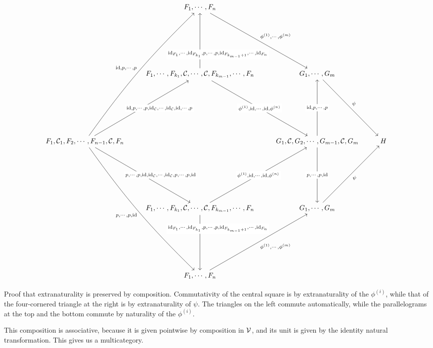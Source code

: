 \begin{SidewaysFigure}
  \[
    \begin{tikzcd}[ampersand replacement=\&, row sep=80pt, column sep=23pt]
        \& F_1,\cdots,F_n \arrow[dr, "{\phi^{(1)},\cdots,\phi^{(m)}}"]
          \&
            \& \\
        \& F_1,\cdots,F_{k_1},\C,\cdots,\C,F_{k_{m-1}},\cdots,F_n \arrow[u, "{\id_{F_1},\cdots,\id_{F_{k_1}},p,\cdots,p,\id_{F_{k_{m-1}+1}},\cdots,\id_{F_n}}"' {description, near start, xshift=6ex}] \arrow[dr, "{\phi^{(1)},\id,\cdots,\id,\phi^{(n)}}" description]
          \& G_1,\cdots,G_m \arrow[dr, "\psi"]
            \& \\
      F_1,\C_1,F_2,\cdots,F_{n-1},\C,F_n \arrow[uur, "{\id,p,\cdots,p}", bend left=5] \arrow[ddr, "{p,\cdots,p,\id}"', bend right=5] \arrow[ur, "{\id,p,\cdots,p,\id_{\C},\cdots,\id_{\C},\id,\cdots,p}"' {description, xshift=6ex}] \arrow[dr, "{p,\cdots,p,\id,\id_{\C},\cdots,\id_{\C},p,\cdots,p,\id}" {description, xshift=6ex}]
        \&
          \& G_1,\C,G_2,\cdots,G_{m-1},\C,G_m \arrow[u, "{\id,p,\cdots,p}" description] \arrow[d, "{p,\cdots,p,\id}" description]
            \& H \\
        \& F_1,\cdots,F_{k_1},\C,\cdots,\C,F_{k_{m-1}},\cdots,F_n \arrow[d, "{\id_{F_1},\cdots,\id_{F_{k_1}},p,\cdots,p,\id_{F_{k_{m-1}+1}},\cdots,\id_{F_n}}"' {description, near start, xshift=6ex}] \arrow[ur, "{\phi^{(1)},\id,\cdots,\id,\phi^{(n)}}" description]
          \& G_1,\cdots,G_m \arrow[ur, "\psi"']
            \& \\
        \& F_1,\cdots,F_n \arrow[ur, "{\phi^{(1)},\cdots,\phi^{(m)}}"']
          \&
            \&
    \end{tikzcd}
    \]
  \caption[Proof that extranaturality is preserved by composition.]
  {Proof that extranaturality is preserved by composition.  
  Commutativity of the central square is by extranaturality of the $\phi^{(i)}$, while that of the four-cornered triangle at the right is by extranaturality of $\psi$.  
  The triangles on the left commute automatically, while the parallelograms at the top and the bottom commute by naturality of the $\phi^{(i)}$.}
  \label{FigExtranaturalityComposition}
\end{SidewaysFigure}

This composition is associative, because it is given pointwise by composition in ${\mathcal{V}}$, and its unit is given by the identity natural transformation.  
This gives us a multicategory.  

